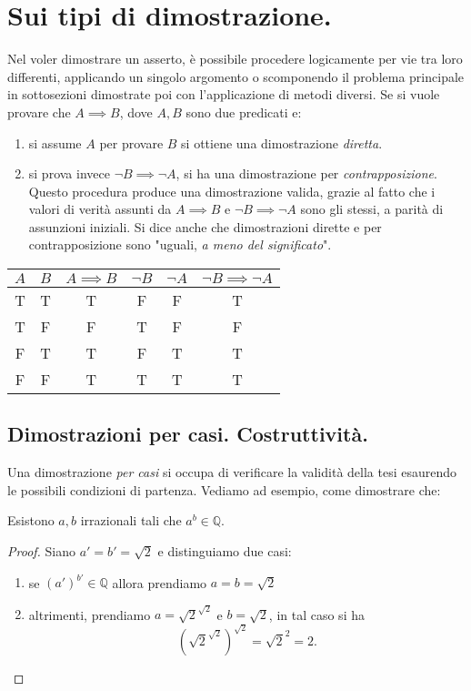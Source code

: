\section{Sui tipi di dimostrazione.}

Nel voler dimostrare un asserto, è possibile procedere logicamente per vie tra loro differenti, applicando un singolo argomento o scomponendo il problema principale in sottosezioni dimostrate poi con l'applicazione di metodi diversi.
Se si vuole provare che \(A \implies B\), dove \(A,B\) sono due predicati e:
\begin{enumerate}
  \item si assume \(A\) per provare \(B\) si ottiene una dimostrazione \emph{diretta}.
  \item si prova invece \(\lnot B \implies \lnot A\), si ha una dimostrazione per \emph{contrapposizione}. Questo procedura produce una dimostrazione valida, grazie al fatto che i valori di verità assunti da \(A \implies B\) e \(\lnot B \implies \lnot A\) sono gli stessi, a parità di assunzioni iniziali. Si dice anche che dimostrazioni dirette e per contrapposizione sono "uguali, \emph{a meno del significato}".
\end{enumerate}
\begin{center}
\begin{tabular}{c|c|c||c|c|c}
  \(A\) & \(B\) & \(A \implies B\) & \(\lnot B\) & \(\lnot A\) & \(\lnot B \implies \lnot A\) \\ \hline
  T & T & T & F & F & T \\
  T & F & F & T & F & F \\
  F & T & T & F & T & T \\
  F & F & T & T & T & T
\end{tabular}
\end{center}

\subsection{Dimostrazioni per casi. Costruttività.}

Una dimostrazione \emph{per casi} si occupa di verificare la validità della tesi esaurendo le possibili condizioni di partenza. Vediamo ad esempio, come dimostrare che:

\begin{thm}
  Esistono \(a,b\) irrazionali tali che \(a^b \in \mathbb{Q}\).
\end{thm}
\begin{proof}
  Siano \(a' = b' = \sqrt{2}\) e distinguiamo due casi:
  \begin{enumerate}
    \item se \((a')^{b'} \in \mathbb{Q}\) allora prendiamo \(a = b = \sqrt{2}\)
    \item altrimenti, prendiamo \(a = \sqrt{2}^{\sqrt{2}}\) e \(b = \sqrt{2}\), in tal caso si ha
    \[
    \left(\sqrt{2}^{\sqrt{2}}\right)^{\sqrt{2}} = \sqrt{2}^2 = 2.
    \]
  \end{enumerate}
\end{proof}

